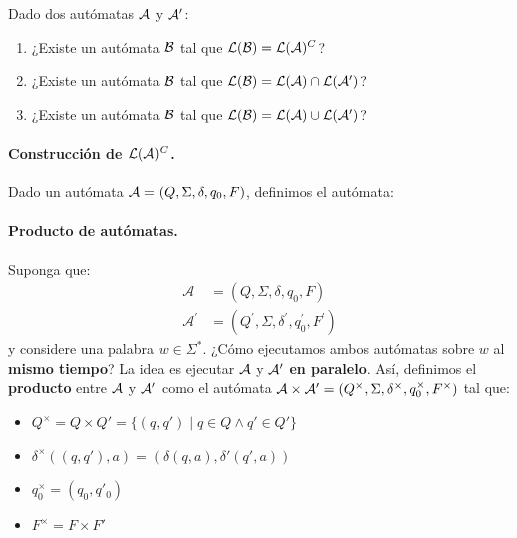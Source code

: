 Dado dos autómatas $\mathcal{A}$ y $\mathcal{A}'$:
\begin{enumerate}
    \item ¿Existe un autómata $\mathcal{B}$ tal que $\mathcal{L}(\mathcal{B}) = \mathcal{L}(\mathcal{A})^C$?
    \item ¿Existe un autómata $\mathcal{B}$ tal que $\mathcal{L}(\mathcal{B}) = \mathcal{L}(\mathcal{A}) \cap \mathcal{L}(\mathcal{A}')$?
    \item ¿Existe un autómata $\mathcal{B}$ tal que $\mathcal{L}(\mathcal{B}) = \mathcal{L}(\mathcal{A}) \cup \mathcal{L}(\mathcal{A}')$?
\end{enumerate}

\paragraph{Construcción de $\mathcal{L}(\mathcal{A})^C$.} Dado un autómata $\mathcal{A} = (Q, \Sigma, \delta, q_0, F)$, definimos el autómata:

\paragraph{Producto de autómatas.} Suponga que:
$$
    \begin{aligned}
        \mathcal{A}          & =\left(Q, \Sigma, \delta, q_0, F\right)                                     \\
        \mathcal{A}^{\prime} & =\left(Q^{\prime}, \Sigma, \delta^{\prime}, q_0^{\prime}, F^{\prime}\right)
    \end{aligned}
$$
y considere una palabra $w \in \Sigma^*$. ¿Cómo ejecutamos ambos autómatas sobre $w$ al \textbf{mismo tiempo}? La idea es ejecutar $\mathcal{A}$ y $\mathcal{A}'$ \textbf{en paralelo}. Así, definimos el \textbf{producto} entre $\mathcal{A}$ y $\mathcal{A}'$ como el autómata $\mathcal{A} \times \mathcal{A}' = (Q^\times, \Sigma, \delta^\times, q_0^\times, F^\times)$ tal que:
\begin{itemize}
    \item $Q^\times = Q \times Q'=\{(q,q')\;|\;q\in Q \wedge q' \in Q'\}$
    \item $\delta^\times((q,q'),a)=(\delta(q,a),\delta'(q',a))$
    \item $q^\times_0=(q_0,q'_0)$
    \item $F^\times=F\times F'$
\end{itemize}



